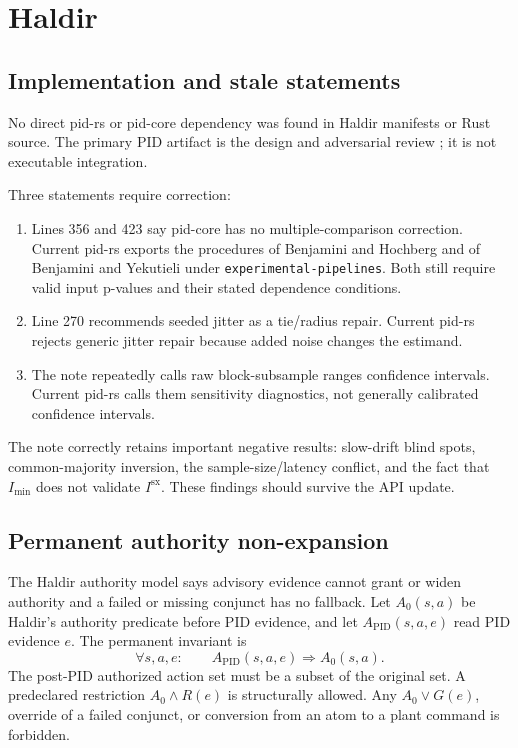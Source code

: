 \documentclass[11pt]{article}
\newcommand{\Sx}{I^{\mathrm{sx}}}
\newcommand{\Imin}{I_{\min}}
\begin{document}
\section{Haldir}

\subsection{Implementation and stale statements}

No direct pid-rs or pid-core dependency was found in Haldir manifests or Rust
source.  The primary PID artifact is the design and adversarial review
; it is not executable integration.

Three statements require correction:
\begin{enumerate}
\item Lines 356 and 423 say pid-core has no multiple-comparison correction.  Current pid-rs exports the procedures of Benjamini and Hochberg and of Benjamini and Yekutieli under \texttt{experimental-pipelines}.  Both still require valid input p-values and their stated dependence conditions.
\item Line 270 recommends seeded jitter as a tie/radius repair.  Current pid-rs rejects generic jitter repair because added noise changes the estimand.
\item The note repeatedly calls raw block-subsample ranges confidence intervals.  Current pid-rs calls them sensitivity diagnostics, not generally calibrated confidence intervals.
\end{enumerate}

The note correctly retains important negative results: slow-drift blind spots,
common-majority inversion, the sample-size/latency conflict, and the fact that
$\Imin$ does not validate $\Sx$.  These findings should survive the API update.

\subsection{Permanent authority non-expansion}

The Haldir authority model says advisory evidence cannot grant or widen authority
and a failed or missing conjunct has no fallback.  Let $A_0(s,a)$ be Haldir's
authority predicate before PID evidence, and let
$A_{\mathrm{PID}}(s,a,e)$ read PID evidence $e$.  The permanent invariant is
\begin{equation}\label{eq:noauthority}
 \forall s,a,e:\qquad
 A_{\mathrm{PID}}(s,a,e)\Longrightarrow A_0(s,a).
\end{equation}
The post-PID authorized action set must be a subset of the original set.  A
predeclared restriction $A_0\wedge R(e)$ is structurally allowed.  Any
$A_0\vee G(e)$, override of a failed conjunct, or conversion from an atom to a
plant command is forbidden.
\end{document}
